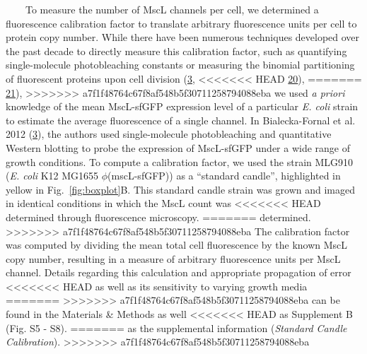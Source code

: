 ~~~~To
measure
the
number
of
MscL
channels
per
cell,
we
determined
a
fluorescence
calibration
factor
to
translate
arbitrary
fluorescence
units
per
cell
to
protein
copy
number.
While
there
have
been
numerous
techniques
developed
over
the
past
decade
to
directly
measure
this
calibration
factor,
such
as
quantifying
single-molecule
photobleaching
constants
or
measuring
the
binomial
partitioning
of
fluorescent
proteins
upon
cell
division
(\protect\hyperlink{ref-bialecka-fornal2012}{3},
<<<<<<< HEAD
\protect\hyperlink{ref-elowitz2002}{20}),
=======
\protect\hyperlink{ref-elowitz2002}{21}),
>>>>>>> a7f1f48764c67f8af548b5f30711258794088eba
we
used
\emph{a
priori}
knowledge
of the
mean
MscL-sfGFP
expression
level
of a
particular
\emph{E.
coli}
strain
to
estimate
the
average
fluorescence
of a
single
channel.
In
Bialecka-Fornal
et al.
2012
(\protect\hyperlink{ref-bialecka-fornal2012}{3}),
the
authors
used
single-molecule
photobleaching
and
quantitative
Western
blotting
to
probe
the
expression
of
MscL-sfGFP
under
a wide
range
of
growth
conditions.
To
compute
a
calibration
factor,
we
used
the
strain
MLG910
(\emph{E.
coli}
K12
MG1655
\(\phi\)(mscL-sfGFP))
as a
``standard
candle'',
highlighted
in
yellow
in
Fig.~\ref{fig:boxplot}B.
This
standard
candle
strain
was
grown
and
imaged
in
identical
conditions
in
which
the
MscL
count
was
<<<<<<< HEAD
determined
through
fluorescence
microscopy.
=======
determined.
>>>>>>> a7f1f48764c67f8af548b5f30711258794088eba
The
calibration
factor
was
computed
by
dividing
the
mean
total
cell
fluorescence
by the
known
MscL
copy
number,
resulting
in a
measure
of
arbitrary
fluorescence
units
per
MscL
channel.
Details
regarding
this
calculation
and
appropriate
propagation
of
error
<<<<<<< HEAD
as
well
as its
sensitivity
to
varying
growth
media
=======
>>>>>>> a7f1f48764c67f8af548b5f30711258794088eba
can be
found
in the
Materials
\&
Methods
as
well
<<<<<<< HEAD
as
Supplement
B
(Fig.
S5 -
S8).
=======
as the
supplemental
information
(\emph{Standard
Candle
Calibration}).
>>>>>>> a7f1f48764c67f8af548b5f30711258794088eba

